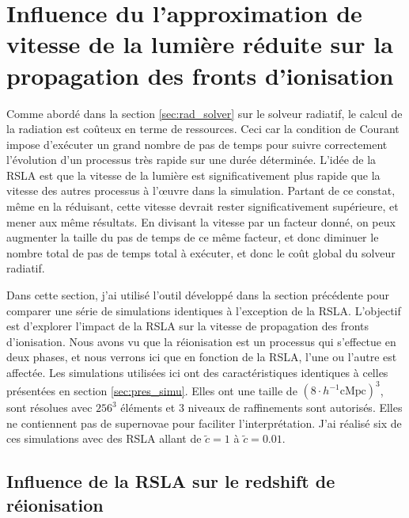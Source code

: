 \chapter{Influence du l'approximation de vitesse de la lumière réduite sur la propagation des fronts d'ionisation}
\label{sec:lightspeed}


Comme abordé dans la section \ref{sec:rad_solver} sur le solveur radiatif, le calcul de la radiation est coûteux en terme de ressources.
Ceci car la condition de Courant impose d'exécuter un grand nombre de pas de temps pour suivre correctement l'évolution d'un processus très rapide sur une durée déterminée.
L'idée de la \ac{RSLA} est que la vitesse de la lumière est significativement plus rapide que la vitesse des autres processus à l’œuvre dans la simulation.
Partant de ce constat, même en la réduisant, cette vitesse devrait rester significativement supérieure, et mener aux même résultats.
En divisant la vitesse par un facteur donné, on peux augmenter la taille du pas de temps de ce même facteur, et donc diminuer le nombre total de pas de temps total à exécuter, et donc le coût global du solveur radiatif.

Dans cette section, j'ai utilisé l'outil développé dans la section précédente pour comparer une série de simulations identiques à l'exception de la \ac{RSLA}.
L'objectif est d'explorer l'impact de la \ac{RSLA} sur la vitesse de propagation des fronts d'ionisation.
Nous avons vu que la réionisation est un processus qui s'effectue en deux phases, et nous verrons ici que en fonction de la \ac{RSLA}, l'une ou l'autre est affectée.
Les simulations utilisées ici ont des caractéristiques identiques à celles présentées en section \ref{sec:pres_simu}.
Elles ont une taille de $\left( 8 \cdot h^{-1} \mathrm{cMpc } \right)^3$, sont résolues avec $256^3$ éléments et 3 niveaux de raffinements sont autorisés.
Elles ne contiennent pas de supernovae pour faciliter l'interprétation.
J'ai réalisé six de ces simulations avec des \ac{RSLA} allant de $\tilde{c}=1$ à $\tilde{c}=0.01$.


\clearpage 
\section{Influence de la RSLA sur le redshift de réionisation}

